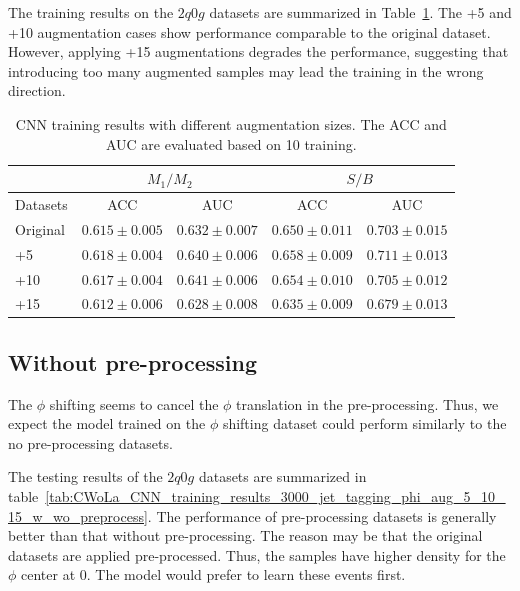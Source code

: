 \documentclass[12pt]{article}
\begin{document}
        The training results on the $2q0g$ datasets are summarized in Table~\ref{tab:CWoLa_CNN_training_results_3000_jet_tagging_eta_phi_aug_5_10_15}. The +5 and +10 augmentation cases show performance comparable to the original dataset. However, applying +15 augmentations degrades the performance, suggesting that introducing too many augmented samples may lead the training in the wrong direction.
        \begin{table}[htpb]
            \centering
            \caption{CNN training results with different augmentation sizes. The ACC and AUC are evaluated based on 10 training.}
            \label{tab:CWoLa_CNN_training_results_3000_jet_tagging_eta_phi_aug_5_10_15}
            \begin{tabular}{l|cc|cc}
                         & \multicolumn{2}{c|}{$M_1 / M_2$}      & \multicolumn{2}{c}{$S / B$}           \\ \hline
                Datasets & ACC               & AUC               & ACC               & AUC               \\ \hline
                Original & $0.615 \pm 0.005$ & $0.632 \pm 0.007$ & $0.650 \pm 0.011$ & $0.703 \pm 0.015$ \\
                +5       & $0.618 \pm 0.004$ & $0.640 \pm 0.006$ & $0.658 \pm 0.009$ & $0.711 \pm 0.013$ \\
                +10      & $0.617 \pm 0.004$ & $0.641 \pm 0.006$ & $0.654 \pm 0.010$ & $0.705 \pm 0.012$ \\
                +15      & $0.612 \pm 0.006$ & $0.628 \pm 0.008$ & $0.635 \pm 0.009$ & $0.679 \pm 0.013$
            \end{tabular}
        \end{table}
    \subsection{Without pre-processing}%
    \label{sub:without_pre_processing}
        The $\phi$ shifting seems to cancel the $\phi$ translation in the pre-processing. Thus, we expect the model trained on the $\phi$ shifting dataset could perform similarly to the no pre-processing datasets.

        The testing results of the $2q0g$ datasets are summarized in table~\ref{tab:CWoLa_CNN_training_results_3000_jet_tagging_phi_aug_5_10_15_w_wo_preprocess}. The performance of pre-processing datasets is generally better than that without pre-processing. The reason may be that the original datasets are applied pre-processed. Thus, the samples have higher density for the $\phi$ center at 0. The model would prefer to learn these events first.
\end{document}
